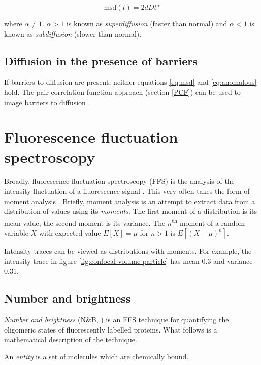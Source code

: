 \documentclass[12pt,]{book}
\theoremstyle{definition}
\theoremstyle{definition}
\theoremstyle{definition}
\theoremstyle{remark}
\let\BeginKnitrBlock\begin \let\EndKnitrBlock\end
\begin{document}
\begin{equation}
\text{msd}(t) = 2dDt^\alpha
\label{eq:anomalous}
\end{equation}

where \(\alpha \neq 1\). \(\alpha > 1\) is known as
\emph{superdiffusion} (faster than normal) and \(\alpha < 1\) is known
as \emph{subdiffusion} (slower than normal).

\subsection{Diffusion in the presence of
barriers}\label{diffusion-in-the-presence-of-barriers}

If barriers to diffusion are present, neither equations \eqref{eq:msd} and
\eqref{eq:anomalous} hold. The pair correlation function approach (section
\ref{PCF}) can be used to image barriers to diffusion \citep{PCF}.

\section{Fluorescence fluctuation spectroscopy}\label{FFS}

Broadly, fluorescence fluctuation spectroscopy (FFS) is the analysis of
the intensity fluctuation of a fluorescence signal \citep{FFS}. This
very often takes the form of moment analysis \citep{QianElson}. Briefly,
moment analysis is an attempt to extract data from a distribution of
values using its \emph{moments}. The first moment of a distribution is
its mean value, the second moment is its variance. The
\(n\)\textsuperscript{th} moment of a random variable \(X\) with
expected value \(E[X]=\mu\) for \(n>1\) is \(E[(X - \mu)^n]\).

Intensity traces can be viewed as distributions with moments. For
example, the intensity trace in figure
\ref{fig:confocal-volume-particle} has mean 0.3 and variance 0.31.

\subsection{Number and brightness}\label{number-and-brightness}

\emph{Number and brightness} (N\&B, \citet{NB}) is an FFS technique for
quantifying the oligomeric states of fluorescently labelled proteins.
What follows is a mathematical description of the technique.

\BeginKnitrBlock{definition}
\protect\hypertarget{def:unnamed-chunk-13}{}{\label{def:unnamed-chunk-13}
}An \emph{entity} is a set of molecules which are chemically bound.
\EndKnitrBlock{definition}
\end{document}
